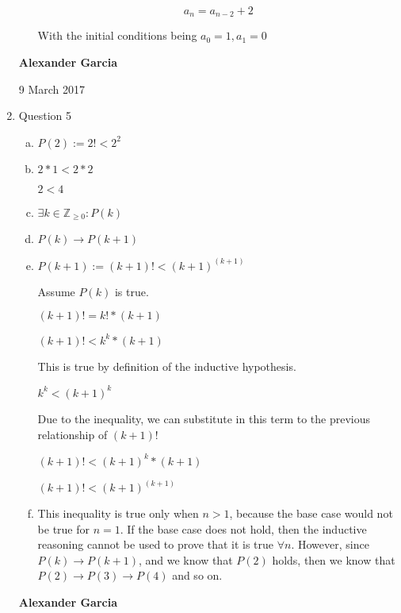 \documentclass[11pt]{article}
\begin{document}
\begin{enumerate}
\begin{enumerate}[(a)]
				$$a_n = a_{n-2} + 2$$

				With the initial conditions being $a_0 = 1, a_1 = 0$ \\

		\end{enumerate}

	\newpage

	\textbf{Alexander Garcia}

	9 March 2017

	\item Question 5

		\begin{enumerate}[(a)]

			\item $P(2):= 2! < 2^2$

			\item $2*1 < 2 * 2$

				$2 < 4$

			\item $\exists k \in \mathbb{Z}_{\geq 0}: P(k)$

			\item $P(k) \rightarrow P(k+1)$

			\item $P(k+1):= (k+1)! < (k+1)^{(k+1)}$

				Assume $P(k)$ is true.

				$(k+1)! = k! * (k+1)$

				$(k+1)! < k^k * (k+1)$

				This is true by definition of the inductive hypothesis.

				$k^k < (k+1)^k$

				Due to the inequality, we can substitute in this term
				to the previous relationship of $(k+1)!$

				$(k+1)! < (k+1)^k * (k+1)$

				$(k+1)! < (k+1)^{(k+1)}$

			\item This inequality is true only when $n > 1$, because the base
				case would not be true for $n = 1$. If the base case does
				not hold, then the inductive reasoning cannot be used to
				prove that it is true $\forall n$. However, since
				$P(k) \rightarrow P(k+1)$, and we know that $P(2)$ holds,
				then we know that $P(2) \rightarrow P(3) \rightarrow P(4)$
				and so on.

		\end{enumerate}

	\newpage

	\textbf{Alexander Garcia}


\end{enumerate}
\end{document}
